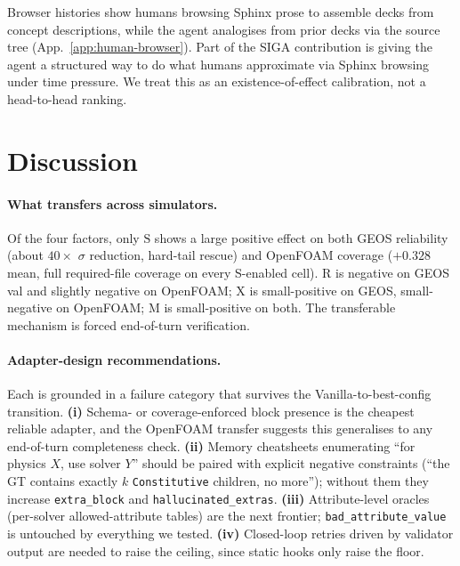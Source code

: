 \documentclass{article}
\begin{document}
Browser histories show humans browsing Sphinx prose to assemble decks from concept descriptions, while the agent analogises from prior decks via the source tree (App.~\ref{app:human-browser}). Part of the SIGA contribution is giving the agent a structured way to do what humans approximate via Sphinx browsing under time pressure. We treat this as an existence-of-effect calibration, not a head-to-head ranking.


\section{Discussion}
\label{sec:discussion}
\label{sec:analysis}
\label{subsec:limitations}

\paragraph{What transfers across simulators.} Of the four factors, only $\mathrm{S}$ shows a large positive effect on both GEOS reliability (about $40\times$ $\sigma$ reduction, hard-tail rescue) and OpenFOAM coverage ($+0.328$ mean, full required-file coverage on every S-enabled cell). $\mathrm{R}$ is negative on GEOS val and slightly negative on OpenFOAM; $\mathrm{X}$ is small-positive on GEOS, small-negative on OpenFOAM; $\mathrm{M}$ is small-positive on both. The transferable mechanism is forced end-of-turn verification.

\paragraph{Adapter-design recommendations.} Each is grounded in a failure category that survives the Vanilla-to-best-config transition. \textbf{(i)} Schema- or coverage-enforced block presence is the cheapest reliable adapter, and the OpenFOAM transfer suggests this generalises to any end-of-turn completeness check. \textbf{(ii)} Memory cheatsheets enumerating ``for physics $X$, use solver $Y$'' should be paired with explicit negative constraints (``the GT contains exactly $k$ \texttt{Constitutive} children, no more''); without them they increase \texttt{extra\_block} and \texttt{hallucinated\_extras}. \textbf{(iii)} Attribute-level oracles (per-solver allowed-attribute tables) are the next frontier; \texttt{bad\_attribute\_value} is untouched by everything we tested. \textbf{(iv)} Closed-loop retries driven by validator output are needed to raise the ceiling, since static hooks only raise the floor.
\end{document}

